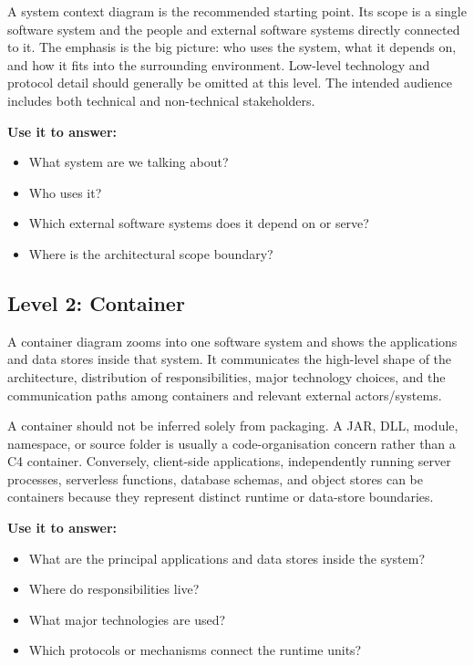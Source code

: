 \documentclass[11pt]{article}
\begin{document}
A system context diagram is the recommended starting point. Its scope is a single software system and the people and external software systems directly connected to it. The emphasis is the big picture: who uses the system, what it depends on, and how it fits into the surrounding environment. Low-level technology and protocol detail should generally be omitted at this level. The intended audience includes both technical and non-technical stakeholders.\cite{c4context}

\textbf{Use it to answer:}
\begin{itemize}
  \item What system are we talking about?
  \item Who uses it?
  \item Which external software systems does it depend on or serve?
  \item Where is the architectural scope boundary?
\end{itemize}

\subsection{Level 2: Container}

A container diagram zooms into one software system and shows the applications and data stores inside that system. It communicates the high-level shape of the architecture, distribution of responsibilities, major technology choices, and the communication paths among containers and relevant external actors/systems.\cite{c4containerdiagram}

A container should not be inferred solely from packaging. A JAR, DLL, module, namespace, or source folder is usually a code-organisation concern rather than a C4 container. Conversely, client-side applications, independently running server processes, serverless functions, database schemas, and object stores can be containers because they represent distinct runtime or data-store boundaries.\cite{c4containerabs}

\textbf{Use it to answer:}
\begin{itemize}
  \item What are the principal applications and data stores inside the system?
  \item Where do responsibilities live?
  \item What major technologies are used?
  \item Which protocols or mechanisms connect the runtime units?
\end{itemize}
\end{document}
